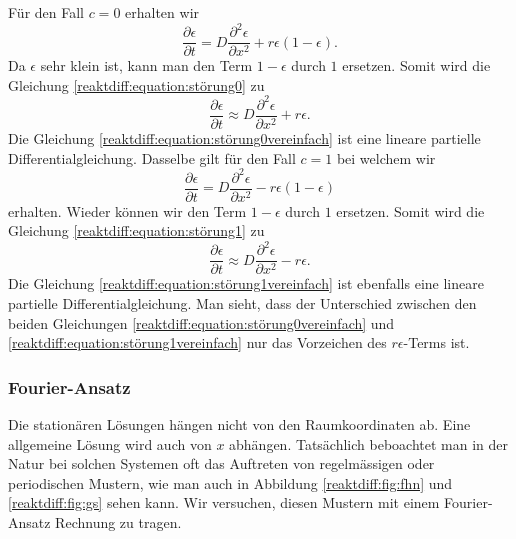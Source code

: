 Für den Fall \(c = 0\) erhalten wir
\begin{equation}
\label{reaktdiff:equation:störung0}
\frac{\partial \epsilon}{\partial t} = D \frac{\partial^2 \epsilon}{\partial x^2} + r\epsilon(1-\epsilon).
\end{equation}
Da \(\epsilon\) sehr klein ist, kann man den Term \(1-\epsilon\) durch \(1\) ersetzen.
Somit wird die Gleichung \eqref{reaktdiff:equation:störung0} zu
\begin{equation}
\label{reaktdiff:equation:störung0vereinfach}
\frac{\partial \epsilon}{\partial t} \approx D \frac{\partial^2 \epsilon}{\partial x^2}  + r\epsilon.
\end{equation}
Die Gleichung \ref{reaktdiff:equation:störung0vereinfach} ist eine lineare partielle Differentialgleichung.
Dasselbe gilt für den Fall \(c = 1\) bei welchem wir
\begin{equation}
\label{reaktdiff:equation:störung1}
\frac{\partial \epsilon}{\partial t} = D \frac{\partial^2 \epsilon}{\partial x^2} - r\epsilon(1-\epsilon)
\end{equation}
erhalten.
Wieder können wir den Term \(1-\epsilon\) durch \(1\) ersetzen.
Somit wird die Gleichung \eqref{reaktdiff:equation:störung1} zu
\begin{equation}
\label{reaktdiff:equation:störung1vereinfach}
\frac{\partial \epsilon}{\partial t} \approx D \frac{\partial^2 \epsilon}{\partial x^2} - r\epsilon.
\end{equation}
Die Gleichung \eqref{reaktdiff:equation:störung1vereinfach} ist ebenfalls eine lineare partielle Differentialgleichung.
Man sieht, dass der Unterschied zwischen den beiden Gleichungen \eqref{reaktdiff:equation:störung0vereinfach} und \eqref{reaktdiff:equation:störung1vereinfach} nur das Vorzeichen des \(r \epsilon\)-Terms ist.

\subsubsection{Fourier-Ansatz}
Die stationären Lösungen hängen nicht von den Raumkoordinaten ab.
Eine allgemeine Lösung wird auch von \(x\) abhängen.
Tatsächlich beboachtet man in der Natur bei solchen Systemen oft das Auftreten von regelmässigen oder periodischen Mustern, wie man auch in Abbildung \ref{reaktdiff:fig:fhn} und \ref{reaktdiff:fig:gs} sehen kann.
Wir versuchen, diesen Mustern mit einem Fourier-Ansatz Rechnung zu tragen.

